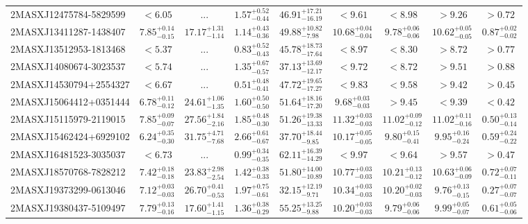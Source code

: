 \documentclass[onecolumn]{mn2e}
\begin{document}
{\begin{center}
\begin{longtable}{lcccccccc}
2MASXJ12475784-5829599 & $<6.05$ & ... & $1.57_{-0.44}^{+0.52}$ &$46.91_{-16.19}^{+17.21}$ & $<9.61$ & $<8.98$ & $>9.26$ & $>0.72$ \\
2MASXJ13411287-1438407 & $7.85_{-0.15}^{+0.14}$ & $17.17_{-1.14}^{+1.31}$ & $1.14_{-0.36}^{+0.43}$ &$49.88_{-7.98}^{+10.82}$ & $10.68_{-0.04}^{+0.04}$ & $9.78_{-0.06}^{+0.06}$ & $10.62_{-0.05}^{+0.05}$ & $0.87_{-0.02}^{+0.02}$ \\
2MASXJ13512953-1813468 & $<5.37$ & ... & $0.83_{-0.43}^{+0.52}$ &$45.78_{-17.64}^{+18.73}$ & $<8.97$ & $<8.30$ & $>8.72$ & $>0.77$ \\
2MASXJ14080674-3023537 & $<5.74$ & ... & $1.35_{-0.57}^{+0.67}$ &$37.13_{-12.17}^{+13.69}$ & $<9.72$ & $<8.72$ & $>9.51$ & $>0.88$ \\
2MASXJ14530794+2554327 & $<6.67$ & ... & $0.51_{-0.41}^{+0.48}$ &$47.72_{-17.27}^{+19.65}$ & $<9.83$ & $<9.58$ & $>9.42$ & $>0.45$ \\
2MASXJ15064412+0351444 & $6.78_{-0.12}^{+0.11}$ & $24.61_{-1.35}^{+1.06}$ & $1.60_{-0.50}^{+0.50}$ &$51.64_{-17.20}^{+18.16}$ & $9.68_{-0.03}^{+0.03}$ & $>9.45$ & $<9.39$ & $<0.42$ \\
2MASXJ15115979-2119015 & $7.85_{-0.07}^{+0.09}$ & $27.56_{-2.16}^{+1.84}$ & $1.85_{-0.30}^{+0.48}$ &$51.26_{-13.33}^{+19.38}$ & $11.32_{-0.03}^{+0.03}$ & $11.02_{-0.12}^{+0.09}$ & $11.02_{-0.16}^{+0.11}$ & $0.50_{-0.14}^{+0.13}$ \\
2MASXJ15462424+6929102 & $6.24_{-0.30}^{+0.35}$ & $31.75_{-7.68}^{+4.71}$ & $2.66_{-0.67}^{+0.61}$ &$37.70_{-9.85}^{+18.44}$ & $10.17_{-0.05}^{+0.05}$ & $9.80_{-0.41}^{+0.15}$ & $9.95_{-0.24}^{+0.16}$ & $0.59_{-0.22}^{+0.24}$ \\
2MASXJ16481523-3035037 & $<6.73$ & ... & $0.99_{-0.35}^{+0.34}$ &$62.11_{-14.29}^{+16.39}$ & $<9.97$ & $<9.64$ & $>9.57$ & $>0.47$ \\
2MASXJ18570768-7828212 & $7.42_{-0.18}^{+0.18}$ & $23.83_{-2.54}^{+2.98}$ & $1.42_{-0.33}^{+0.38}$ &$51.80_{-10.89}^{+14.00}$ & $10.77_{-0.03}^{+0.03}$ & $10.21_{-0.12}^{+0.13}$ & $10.63_{-0.09}^{+0.06}$ & $0.72_{-0.11}^{+0.07}$ \\
2MASXJ19373299-0613046 & $7.12_{-0.03}^{+0.03}$ & $26.70_{-0.53}^{+0.41}$ & $1.97_{-0.61}^{+0.75}$ &$32.15_{-9.71}^{+12.19}$ & $10.34_{-0.03}^{+0.03}$ & $10.20_{-0.03}^{+0.02}$ & $9.76_{-0.15}^{+0.13}$ & $0.27_{-0.07}^{+0.07}$ \\
2MASXJ19380437-5109497 & $7.79_{-0.16}^{+0.13}$ & $17.60_{-1.15}^{+1.41}$ & $1.36_{-0.29}^{+0.38}$ &$55.25_{-9.88}^{+13.25}$ & $10.20_{-0.03}^{+0.03}$ & $9.79_{-0.06}^{+0.06}$ & $9.99_{-0.07}^{+0.05}$ & $0.61_{-0.06}^{+0.05}$ \\

\end{longtable}
\end{center}}
\end{document}
